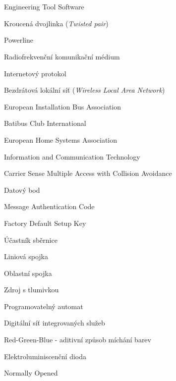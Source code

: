 \cleardoublepage
\chapter*{\listofabbrevname}
{}

\begin{acronym}[KolikMista]

		{Engineering Tool Software}

		{Kroucená dvojlinka (\textit{Twisted pair})}
	
		{Powerline}

		{Radiofrekvenční komunikační médium}
		
		{Internetový protokol}
		
		{Bezdrátová lokální síť (\textit{Wireless Local Area Network})}
		
		{European Installation Bus Association}
	
		{Batibus Club International}
	
		{European Home Systems Association}
	
		{Information and Communication Technology}
	
		{Carrier Sense Multiple Access with Collision Avoidance}
	
		{Datový bod}
	
		{Message Authentication Code}
	
		{Factory Default Setup Key}
	
		{Účastník sběrnice}
	
		{Liniová spojka}
	
		{Oblastní spojka}
	
		{Zdroj s tlumivkou}
	
		{Programovatelný automat}
	
		{Digitální síť integrovaných služeb}
	
		{Red-Green-Blue - aditivní způsob míchání barev}
	
		{Elektroluminiscenční dioda}
	
		{Normally Opened}
	
		
\end{acronym}
